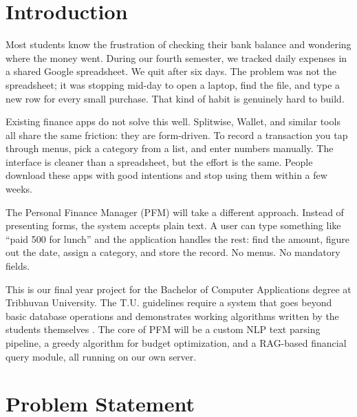 \documentclass[12pt, a4paper]{article}
\begin{document}
\newpage
\renewcommand{\contentsname}{\centerline{\fontsize{16}{19.2}\normalfont\bfseries TABLE OF CONTENTS}}
\tableofcontents
\newpage

\setcounter{page}{1}

\section{Introduction}

Most students know the frustration of checking their bank balance and wondering where the money went. During our fourth semester, we tracked daily expenses in a shared Google spreadsheet. We quit after six days. The problem was not the spreadsheet; it was stopping mid-day to open a laptop, find the file, and type a new row for every small purchase. That kind of habit is genuinely hard to build.

Existing finance apps do not solve this well. Splitwise, Wallet, and similar tools all share the same friction: they are form-driven. To record a transaction you tap through menus, pick a category from a list, and enter numbers manually. The interface is cleaner than a spreadsheet, but the effort is the same. People download these apps with good intentions and stop using them within a few weeks.

The Personal Finance Manager (PFM) will take a different approach. Instead of presenting forms, the system accepts plain text. A user can type something like ``paid 500 for lunch'' and the application handles the rest: find the amount, figure out the date, assign a category, and store the record. No menus. No mandatory fields.

This is our final year project for the Bachelor of Computer Applications degree at Tribhuvan University. The T.U. guidelines require a system that goes beyond basic database operations and demonstrates working algorithms written by the students themselves \cite{tuguide}. The core of PFM will be a custom NLP text parsing pipeline, a greedy algorithm for budget optimization, and a RAG-based financial query module, all running on our own server.

\newpage
\section{Problem Statement}
\end{document}

